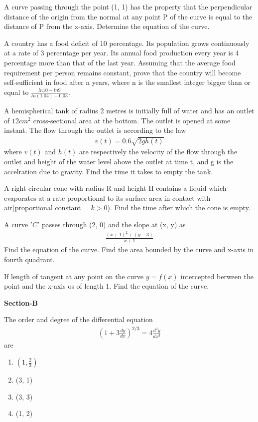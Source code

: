 \item A curve passing through the point (1, 1) has the property that the perpendicular distance of the origin from the normal at any point P of the curve is equal to the distance of P from the x-axis. Determine the equation of the curve.

\item A country has a food deficit of 10 percentage. Its population grows continuously at a rate of 3 percentage per year. Its annual food production every year is 4 percentage more than that of the last year. Assuming that the average food requirement per person remains constant, prove that the country will become self-sufficient in food after n years, where n is the smallest integer bigger than or equal to $\frac{ln 10 - ln 9}{ln(1.04) - 0.03}$.

\item A hemispherical tank of radius 2 metres is initially full of water and has an outlet of $12cm^{2}$ cross-sectional area at the bottom. The outlet is opened at some instant. The flow through the outlet is according to the law 
\begin{align*}
v(t) = 0.6\sqrt{2gh(t)}
\end{align*}
where $v(t)$ and $h(t)$ are respectively the velocity of the flow through the outlet and height of the water level above the outlet at time t, and g is the accelration due to gravity. Find the time it takes to empty the tank.

\item A right circular cone with radius R and height H contains a liquid which evaporates at a rate proportional to its surface area in contact with air(proportional constant = $k > 0$). Find the time after which the cone is empty.

\item A curve $'C'$ passes through (2, 0) and the slope at (x, y) as 
\begin{align*}
\frac{(x + 1)^2 + (y - 3)}{x + 1}
\end{align*}
Find the equation of the curve. Find the area bounded by the curve and x-axis in fourth quadrant.

\item If length of tangent at any point on the curve $y = f(x)$ intercepted berween the point and the x-axis os of length 1. Find the equation of the curve.

\textbf{Section-B}

\item The order and degree of the differential equation
\begin{align*}
\left(1 + 3\frac{dy}{dx}\right)^{2/3} = 4\frac{d^{3}y}{dx^{3}}
\end{align*}
 are
\begin{enumerate}
\item $\left(1, \frac{2}{3}\right)$
\item (3, 1)
\item (3, 3)
\item (1, 2) 
\end{enumerate}

